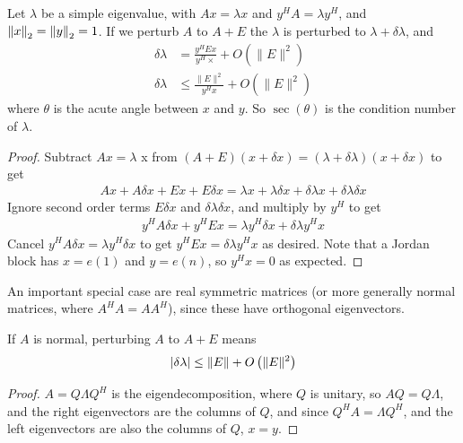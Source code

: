 \documentclass[11pt]{article}
\numberwithin{equation}{section}
\begin{document}
\begin{theorem}
    Let $\lambda$ be a simple eigenvalue, with $A x = \lambda x$ and $y^H A = \lambda y^H$, and $\left\| x \right\|_2 = \left\| y \right\|_2 = 1$.
    If we perturb $A$ to $A + E$ the $\lambda$ is perturbed to $\lambda + \delta \lambda$, and \begin{align*}
        \delta \lambda &= \frac{y^{H} E x}{y^{H} \times} + O\left(\|E\|^{2}\right) \\
        \delta \lambda &\leq \frac{\|E\|^{2}}{y^H x} + O\left(\|E\|^{2}\right)
    \end{align*}
    where $\theta$ is the acute angle between $x$ and $y$. So $\sec(\theta)$ is the condition number of $\lambda$.
    \begin{proof}
        Subtract $A x = \lambda$ x from $(A+E)(x+ \delta x) = (\lambda + \delta \lambda)(x+\delta x)$ to get \begin{align*}
            A x+A \delta x+Ex+E \delta x=\lambda x+ \lambda \delta x+ \delta \lambda x + \delta\lambda \delta x
        \end{align*}
        Ignore second order terms $E \delta x$ and $\delta \lambda \delta x$, and multiply by $y^H$ to get \begin{align*}
            y^H A \delta x + y^H E x = \lambda y^H \delta x + \delta \lambda y^H x
        \end{align*}
        Cancel $y^H A \delta x = \lambda y^H \delta x$ to get $y^H E x = \delta \lambda y^H x$ as desired.
        Note that a Jordan block has $x = e(1)$ and $y = e(n)$, so $y^H x = 0$ as expected.
    \end{proof}
\end{theorem}

An important special case are real symmetric matrices (or more generally normal matrices, where $A^H A = A A^H$), since these have orthogonal eigenvectors.

\begin{corollary}
    If $A$ is normal, perturbing $A$ to $A+E$ means \begin{align*}
        | \delta\lambda | \leq \left\| E \right\| + O\left(\|E\|^{2}\right)
    \end{align*}
    \begin{proof}
        $A = Q \Lambda Q^H$ is the eigendecomposition, where $Q$ is unitary, so $AQ = Q\Lambda$, and the right eigenvectors are the columns of $Q$, 
        and since $Q^H A = \Lambda Q^H$, and the left eigenvectors are also the columns of $Q$, $x = y$.        
    \end{proof}    
\end{corollary}
\end{document}
